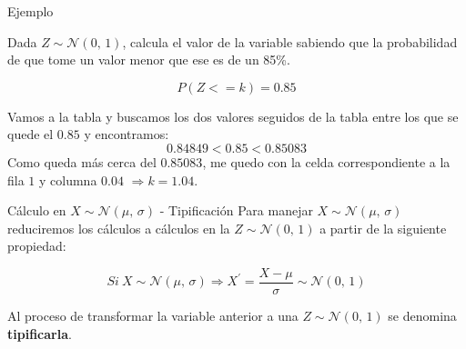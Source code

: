 \documentclass[11pt,handout]{beamer}
\begin{document}
\begin{frame}{Ejemplo}

Dada $Z \sim \mathcal{N}(0,\,1)$, calcula el valor de la variable sabiendo que la probabilidad de que tome un valor menor que ese es de un 85\%. 

$$P(Z<=k)=0.85$$
    \begin{center}
    \end{center}

Vamos a la tabla y buscamos los dos valores seguidos de la tabla entre los que se quede el $0.85$ y encontramos:
$$0.84849 < 0.85 < 0.85083 $$
Como queda más cerca del $0.85083$, me quedo con la celda correspondiente a la fila $1$ y columna $0.04$  $\Rightarrow k=1.04$.
\end{frame}

\begin{frame}{Cálculo en $X \sim \mathcal{N}(\mu,\,\sigma)$ - Tipificación}
Para manejar $X \sim \mathcal{N}(\mu,\,\sigma)$ reduciremos los cálculos a cálculos en la $Z \sim \mathcal{N}(0,\,1)$ a partir de la siguiente propiedad:

\begin{block}{}
$$ Si \  X \sim \mathcal{N}(\mu,\,\sigma) \Rightarrow X^{'}=\frac{X - \mu}{\sigma} \sim \mathcal{N}(0,\,1) $$
\end{block}

\pause

Al proceso de transformar la variable anterior a una $Z\sim \mathcal{N}(0,\,1)$ se denomina \textbf{tipificarla}.


\end{frame}
\end{document}
